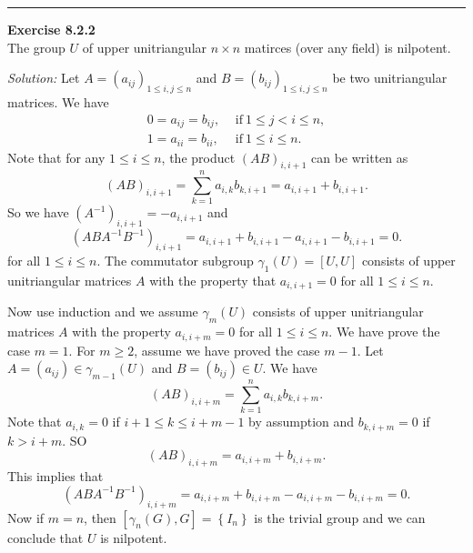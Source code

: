 \documentclass[a4paper, 12pt]{article}
\newenvironment{problem}[2][Exercise]
    { \begin{mdframed}[backgroundcolor=gray!20] \textbf{#1 #2} \\}
    {  \end{mdframed}}
\newenvironment{solution}
    {\textit{Solution:}}
    {}
\begin{document}
\noindent\rule{7in}{2.8pt}
\begin{problem}{8.2.2}
The group \(U\) of upper unitriangular \(n\times n\) matirces (over any field) is nilpotent.
\end{problem}
\begin{solution}
Let \(A=(a_{ij})_{1\leq i,j\leq n}\) and \(B=(b_{ij})_{1\leq i,j\leq n}\) be two unitriangular matrices. We have 
\begin{align*}
    0=a_{ij}=b_{ij},\ &\, \text{if}\ 1\leq j<i\leq n,\\ 
    1=a_{ii}=b_{ii},\ &\, \text{if}\ 1\leq i\leq n.
\end{align*}
Note that for any \(1\leq i\leq n\), the product \((AB)_{i,i+1}\) can be written as 
\[(AB)_{i,i+1}=\sum_{k=1}^{n}a_{i,k}b_{k,i+1}=a_{i,i+1}+b_{i,i+1}.\]
So we have \((A^{-1})_{i,i+1}=-a_{i,i+1}\) and 
\[(ABA^{-1}B^{-1})_{i,i+1}=a_{i,i+1}+b_{i,i+1}-a_{i,i+1}-b_{i,i+1}=0.\]
for all \(1\leq i\leq n\). The commutator subgroup \(\gamma_1(U)=[U,U]\) consists of upper unitriangular matrices \(A\) with the property that \(a_{i,i+1}=0\) for all \(1\leq i\leq n\). 

Now use induction and we assume \(\gamma_m(U)\) consists of upper unitriangular matrices \(A\) with the property \(a_{i,i+m}=0\) for all \(1\leq i\leq n\). We have prove the case \(m=1\). For \(m\geq 2\), assume we have proved the case \(m-1\). 
Let \(A=(a_{ij})\in \gamma_{m-1}(U)\) and \(B=(b_{ij})\in U\). We have 
\[(AB)_{i,i+m}=\sum_{k=1}^{n}a_{i,k}b_{k,i+m}.\]
Note that \(a_{i,k}=0\) if \(i+1\leq k\leq i+m-1\) by assumption and \(b_{k,i+m}=0\) if \(k>i+m\). SO 
\[(AB)_{i,i+m}=a_{i,i+m}+b_{i,i+m}.\]
This implies that 
\[(ABA^{-1}B^{-1})_{i,i+m}=a_{i,i+m}+b_{i,i+m}-a_{i,i+m}-b_{i,i+m}=0.\]
Now if \(m=n\), then \([\gamma_n(G),G]=\left\{ I_n \right\}\) is the trivial group and we can conclude that \(U\) is nilpotent.
\end{solution}
\end{document}
